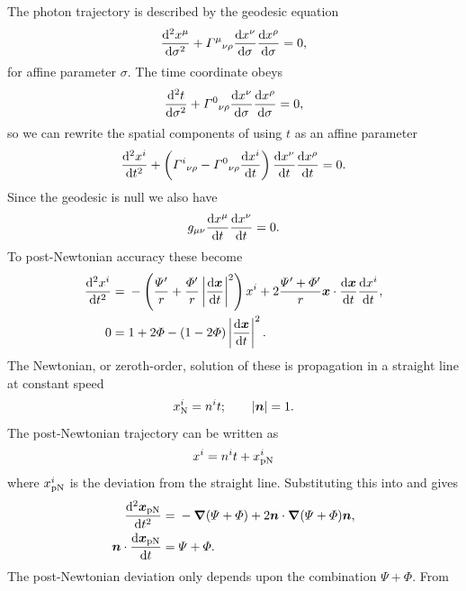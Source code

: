 The photon trajectory is described by the geodesic equation
\begin{equation}
\frac{\mathrm{d}^2 {x^\mu}}{\mathrm{d} {\sigma}^2} + {\Gamma^\mu}_{\nu\rho}\frac{\mathrm{d} {x^\nu}}{\mathrm{d} {\sigma}}\frac{\mathrm{d} {x^\rho}}{\mathrm{d} {\sigma}} = 0,
\label{eq:Geodesic}
\end{equation}
for affine parameter $\sigma$. The time coordinate obeys
\begin{equation}
\frac{\mathrm{d}^2 {t}}{\mathrm{d} {\sigma}^2} + {\Gamma^0}_{\nu\rho}\frac{\mathrm{d} {x^\nu}}{\mathrm{d} {\sigma}}\frac{\mathrm{d} {x^\rho}}{\mathrm{d} {\sigma}} = 0,
\end{equation}
so we can rewrite the spatial components of  using $t$ as an affine parameter~\cite{Will1993}
\begin{equation}
\frac{\mathrm{d}^2 {x^i}}{\mathrm{d} {t}^2} + \left({\Gamma^i}_{\nu\rho} - {\Gamma^0}_{\nu\rho}\frac{\mathrm{d} {x^i}}{\mathrm{d} {t}}\right)\frac{\mathrm{d} {x^\nu}}{\mathrm{d} {t}}\frac{\mathrm{d} {x^\rho}}{\mathrm{d} {t}} = 0.
\end{equation}
Since the geodesic is null we also have
\begin{equation}
g_{\mu\nu}\frac{\mathrm{d} {x^\mu}}{\mathrm{d} {t}}\frac{\mathrm{d} {x^\nu}}{\mathrm{d} {t}} = 0.
\end{equation}
To post-Newtonian accuracy these become
\begin{align}
\label{eq:Trajectory_1}
\frac{\mathrm{d}^2 {x^i}}{\mathrm{d} {t}^2} = {} & -\left(\frac{\Psi'}{r} + \frac{\Phi'}{r}\left|\frac{\mathrm{d} {\boldsymbol{x}}}{\mathrm{d} {t}}\right|^2\right)x^i + 2\frac{\Psi' + \Phi'}{r}\boldsymbol{x}\cdot\frac{\mathrm{d} {\boldsymbol{x}}}{\mathrm{d} {t}}\frac{\mathrm{d} {x^i}}{\mathrm{d} {t}}, \\
0 = {} & 1 + 2\Phi - \left(1 - 2\Phi\right)\left|\frac{\mathrm{d} {\boldsymbol{x}}}{\mathrm{d} {t}}\right|^2.
\label{eq:Trajectory_2}
\end{align}
The Newtonian, or zeroth-order, solution of these is propagation in a straight line at constant speed~\cite{Will1993}
\begin{equation}
x^i_\mathrm{N} = n^it; \qquad |\boldsymbol{n}| = 1.
\end{equation}
The post-Newtonian trajectory can be written as
\begin{equation}
x^i = n^it + x^i_\mathrm{pN}
\end{equation}
where $x^i_\mathrm{pN}$ is the deviation from the straight line. Substituting this into  and  gives
\begin{align}
\frac{\mathrm{d}^2 {\boldsymbol{x}_\mathrm{pN}}}{\mathrm{d} {t}^2} = {} & -\boldsymbol{\nabla}(\Psi + \Phi) + 2\boldsymbol{n}\cdot\boldsymbol{\nabla}(\Psi + \Phi)\boldsymbol{n}, \\
\boldsymbol{n}\cdot\frac{\mathrm{d} {\boldsymbol{x}_\mathrm{pN}}}{\mathrm{d} {t}} = {} & \Psi + \Phi.
\end{align}
The post-Newtonian deviation only depends upon the combination $\Psi + \Phi$. From 

